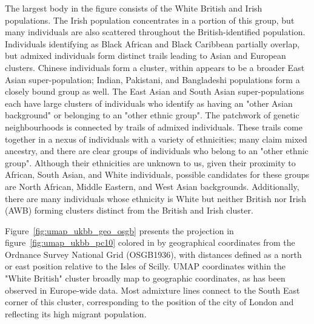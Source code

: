 \documentclass[12pt]{pnas-new}
\begin{document}
The largest body in the figure consists of the White British and Irish populations. The Irish population concentrates in a portion of this group, but many individuals are also scattered throughout the British-identified population. Individuals identifying as Black African and Black Caribbean partially overlap, but admixed individuals form distinct trails leading to Asian and European clusters. Chinese individuals form a cluster, within appears to be a broader East Asian super-population; Indian, Pakistani, and Bangladeshi populations form a closely bound group as well. The East Asian and South Asian super-populations each have large clusters of individuals who identify as having an "other Asian background" or belonging to an "other ethnic group". The patchwork of genetic neighbourhoods is connected by trails of admixed individuals. These trails come together in a nexus of individuals with a variety of ethnicities; many claim mixed ancestry, and there are clear groups of individuals who belong to an "other ethnic group". Although their ethnicities are unknown to us, given their proximity to African, South Asian, and White individuals, possible candidates for these groups are North African, Middle Eastern, and West Asian backgrounds. Additionally, there are many individuals whose ethnicity is White but neither British nor Irish (AWB) forming clusters distinct from the British and Irish cluster.

Figure~\ref{fig:umap_ukbb_geo_osgb} presents the projection in figure~\ref{fig:umap_ukbb_pc10} colored in by  geographical coordinates from the Ordnance Survey National Grid (OSGB1936), with distances defined as a north or east position relative to the Isles of Scilly. UMAP coordinates within the "White British" cluster broadly map to geographic coordinates, as has been observed in Europe-wide data\cite{novembre2008europe}. Most admixture lines connect to the South East corner of this cluster, corresponding to the position of the city of London and reflecting its high migrant population.  
\end{document}
